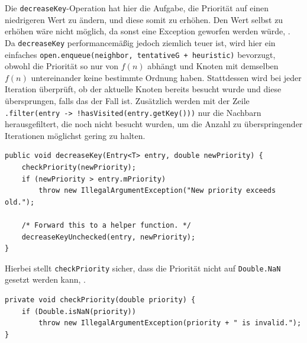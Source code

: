                 Die \lstinline{decreaseKey}-Operation hat hier die Aufgabe, die Priorität auf einen niedrigeren Wert zu ändern, und diese somit zu erhöhen. Den Wert selbst zu erhöhen wäre nicht möglich, da sonst eine Exception geworfen werden würde, . Da \lstinline{decreaseKey} performancemäßig jedoch ziemlich teuer ist, wird hier ein einfaches \lstinline{open.enqueue(neighbor, tentativeG + heuristic)} bevorzugt, obwohl die Priorität so nur von $f(n)$ abhängt und Knoten mit demselben $f(n)$ untereinander keine bestimmte Ordnung haben. Stattdessen wird bei jeder Iteration überprüft, ob der aktuelle Knoten bereits besucht wurde und diese übersprungen, falls das der Fall ist. Zusätzlich werden mit der Zeile \lstinline{.filter(entry -> !hasVisited(entry.getKey()))} nur die Nachbarn herausgefiltert, die noch nicht besucht wurden, um die Anzahl zu überspringender Iterationen möglichst gering zu halten.

                \begin{lstlisting}[caption=decreaseKey-Methode aus \texttt{FibonacciHeap.java}, label=lst:decrease-key]
public void decreaseKey(Entry<T> entry, double newPriority) {
    checkPriority(newPriority);
    if (newPriority > entry.mPriority)
        throw new IllegalArgumentException("New priority exceeds old.");

    /* Forward this to a helper function. */
    decreaseKeyUnchecked(entry, newPriority);
}
                \end{lstlisting}

                Hierbei stellt \lstinline{checkPriority} sicher, dass die Priorität nicht auf \lstinline{Double.NaN} gesetzt werden kann, .

                \begin{lstlisting}[caption=checkPriority-Methode aus \texttt{FibonacciHeap.java}, label=lst:check-priority]
private void checkPriority(double priority) {
    if (Double.isNaN(priority))
        throw new IllegalArgumentException(priority + " is invalid.");
}
                \end{lstlisting}

